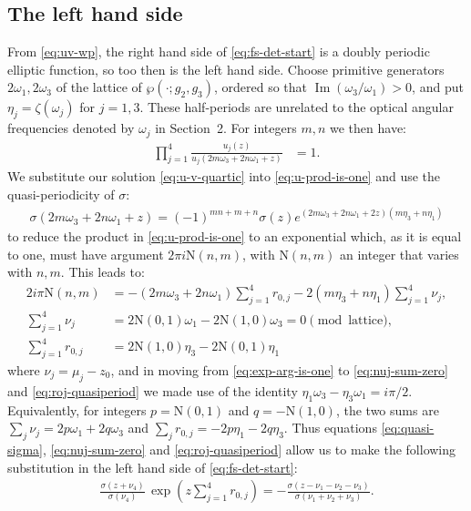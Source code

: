 \documentclass[11pt,a4paper]{article}
\numberwithin{equation}{section}
\begin{document}
\subsection{The left hand side}
From \eqref{eq:uv-wp}, the right hand side of \eqref{eq:fs-det-start} is a doubly periodic elliptic function,
so too then is the left hand side.
Choose primitive generators $2\omega_1,2\omega_3$ of the lattice of $\wp(\cdot;g_2,g_3)$, ordered so that $\operatorname{Im}(\omega_3/\omega_1)>0$, and put $\eta_j=\zeta(\omega_j)$ for $j=1,3$.
These half-periods are unrelated to the optical angular frequencies denoted by $\omega_j$ in Section~2.
For integers $m,n$ we then have:
\begin{align}
\prod_{j=1}^{4} \frac{u_j{\left(z\right)}}{u_j{\left(2 m {\omega}_{3} + 2 n {\omega}_{1} + z\right)}} & = 1. \label{eq:u-prod-is-one}
\end{align}
We substitute our solution \eqref{eq:u-v-quartic} into \eqref{eq:u-prod-is-one} and use the quasi-periodicity of $\sigma$:
\begin{align}
\sigma{\left(2 m {\omega}_{3} + 2 n {\omega}_{1} + z\right)} = \left(-1\right)^{m n + m + n} \sigma{\left(z\right)} e^{\left(2 m {\omega}_{3} + 2 n {\omega}_{1} + 2 z\right) \left(m\eta_3+n\eta_1\right)} \label{eq:quasi-sigma}
\end{align}
to reduce the product in \eqref{eq:u-prod-is-one} to an exponential which, as it is equal to one, must have argument $2\pi i \mathrm{N}(n,m)$, with $\mathrm{N}(n,m)$ an integer that varies with $n,m$.
This leads to:
\begin{align}
2 i \pi \mathrm{N}{\left(n,m \right)} &= - \left(2 m {\omega}_{3} + 2 n {\omega}_{1}\right) \sum_{j=1}^{4} {r}_{0,j} - 2 \left(m\eta_3+n\eta_1\right) \sum_{j=1}^{4} {\nu}_{j}, \label{eq:exp-arg-is-one} \\
\sum_{j=1}^{4} {\nu}_{j} &= 2 \mathrm{N}{\left(0,1 \right)} {\omega}_{1} - 2 \mathrm{N}{\left(1,0 \right)} {\omega}_{3} = 0 \pmod{\text{lattice}}, \label{eq:nuj-sum-zero}  \\
\sum_{j=1}^{4} {r}_{0,j} &= 2\mathrm{N}(1,0)\eta_3-2\mathrm{N}(0,1)\eta_1 \label{eq:roj-quasiperiod}
\end{align}
where $\nu_j=\mu_j-z_0$, and in moving from \eqref{eq:exp-arg-is-one} to \eqref{eq:nuj-sum-zero} and \eqref{eq:roj-quasiperiod} we made use of the identity $\eta_1\omega_3-\eta_3\omega_1=i\pi/2$.
Equivalently, for integers $p=\mathrm{N}(0,1)$ and $q=-\mathrm{N}(1,0)$, the two sums are $\sum_j\nu_j=2p\omega_1+2q\omega_3$ and $\sum_jr_{0,j}=-2p\eta_1-2q\eta_3$. Thus equations \eqref{eq:quasi-sigma}, \eqref{eq:nuj-sum-zero} and \eqref{eq:roj-quasiperiod} allow us to make the following substitution in the left hand side of \eqref{eq:fs-det-start}:
\begin{align}
\frac{\sigma{\left(z + {\nu}_{4} \right)}}{\sigma{\left({\nu}_{4} \right)}}\,\exp{\left(z \sum\limits_{j=1}^{4} {r}_{0,j}\right)} = - \frac{\sigma{\left(z - {\nu}_{1} - {\nu}_{2} - {\nu}_{3} \right)}}{\sigma{\left({\nu}_{1} + {\nu}_{2} + {\nu}_{3} \right)}}.
\end{align}
\end{document}
